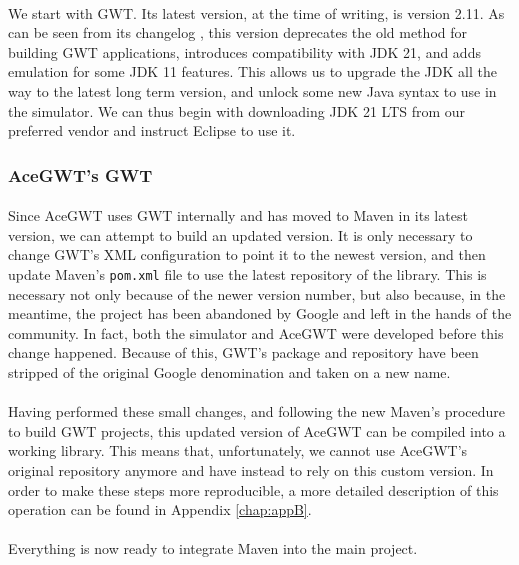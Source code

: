 \paragraph{}
We start with GWT. Its latest version, at the time of writing, is version 2.11. As can be seen from its changelog \cite{web:gwt2.11}, this version deprecates the old method for building GWT applications, introduces compatibility with JDK 21, and adds emulation for some JDK 11 features. This allows us to upgrade the JDK all the way to the latest long term version, and unlock some new Java syntax to use in the simulator. We can thus begin with downloading JDK 21 LTS from our preferred vendor and instruct Eclipse to use it.
\subsubsection{AceGWT's GWT}
\paragraph{}
Since AceGWT uses GWT internally and has moved to Maven in its latest version, we can attempt to build an updated version.  It is only necessary to change GWT's XML configuration to point it to the newest version, and then update Maven's \verb|pom.xml| file to use the latest repository of the library. This is necessary not only because of the newer version number, but also because, in the meantime, the project has been abandoned by Google and left in the hands of the community. In fact, both the simulator and AceGWT were developed before this change happened. Because of this, GWT's package and repository have been stripped of the original Google denomination and taken on a new name.
\paragraph{}
Having performed these small changes, and following the new Maven's procedure to build GWT projects, this updated version of AceGWT can be compiled into a working library. This means that, unfortunately, we cannot use AceGWT's original repository anymore and have instead to rely on this custom version. In order to make these steps more reproducible, a more detailed description of this operation can be found in Appendix \ref{chap:appB}.
\paragraph{}
Everything is now ready to integrate Maven into the main project.
